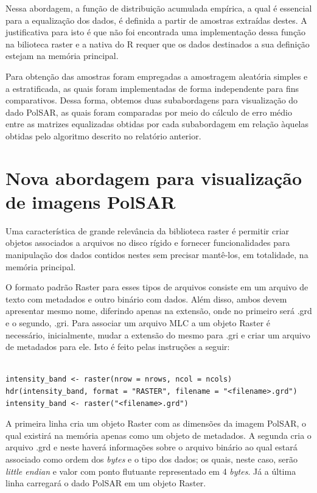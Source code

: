 \documentclass[12pt]{article}
\begin{document}
Nessa abordagem, a função de distribuição acumulada empírica, a qual é essencial para a equalização dos dados, é definida a partir de amostras extraídas destes. A justificativa para isto é que não foi encontrada uma implementação dessa função na bilioteca raster e a nativa do R requer que os dados destinados a sua definição estejam na memória principal.

Para obtenção das amostras foram empregadas a amostragem aleatória simples e a estratificada, as quais foram implementadas de forma independente para fins comparativos. Dessa forma, obtemos duas subabordagens para visualização do dado PolSAR, as quais foram comparadas por meio do cálculo de erro médio entre as matrizes equalizadas obtidas por cada subabordagem em relação àquelas obtidas pelo algoritmo descrito no relatório anterior.

\section{Nova abordagem para visualização de imagens PolSAR}

Uma característica de grande relevância da biblioteca raster é permitir criar objetos associados a arquivos no disco rígido e fornecer funcionalidades para manipulação dos dados contidos nestes sem precisar mantê-los, em totalidade, na memória principal.

O formato padrão Raster para esses tipos de arquivos consiste em um arquivo de texto com metadados e outro binário com dados. Além disso, ambos devem apresentar mesmo nome, diferindo apenas na extensão, onde no primeiro será .grd e o segundo, .gri. Para associar um arquivo MLC a um objeto Raster é necessário, inicialmente, mudar a extensão do mesmo para .gri e criar um arquivo de metadados para ele. Isto é feito pelas instruções a seguir:

\begin{verbatim}

intensity_band <- raster(nrow = nrows, ncol = ncols)
hdr(intensity_band, format = "RASTER", filename = "<filename>.grd")
intensity_band <- raster("<filename>.grd")

\end{verbatim}

A primeira linha cria um objeto Raster com as dimensões da imagem PolSAR, o qual existirá na memória apenas como um objeto de metadados. A segunda cria o arquivo .grd e neste haverá informações sobre o arquivo binário ao qual estará associado como ordem dos \textit{bytes} e o tipo dos dados; os quais, neste caso, serão \textit{little endian} e valor com ponto flutuante representado em 4 \textit{bytes}. Já a última linha carregará o dado PolSAR em um objeto Raster.
\end{document}
